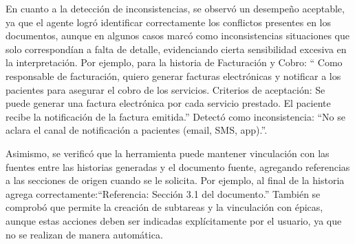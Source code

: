 En cuanto a la detección de inconsistencias, se observó un desempeño aceptable, ya que el agente logró identificar correctamente los conflictos presentes en los documentos, aunque en algunos casos marcó como inconsistencias situaciones que solo correspondían a falta de detalle, evidenciando cierta sensibilidad excesiva en la interpretación. Por ejemplo, para la historia de Facturación y Cobro:
`` Como responsable de facturación, quiero generar facturas electrónicas y notificar a los pacientes para asegurar el cobro de los servicios. Criterios de aceptación:
Se puede generar una factura electrónica por cada servicio prestado.
El paciente recibe la notificación de la factura emitida.'' Detectó como inconsistencia:
``No se aclara el canal de notificación a pacientes (email, SMS, app).''.

Asimismo, se verificó que la herramienta puede mantener vinculación con las fuentes entre las historias generadas y el documento fuente, agregando referencias a las secciones de origen cuando se le solicita. Por ejemplo, al final de la historia agrega correctamente:``Referencia: Sección 3.1 del documento.'' También se comprobó que permite la creación de subtareas y la vinculación con épicas, aunque estas acciones deben ser indicadas explícitamente por el usuario, ya que no se realizan de manera automática.


